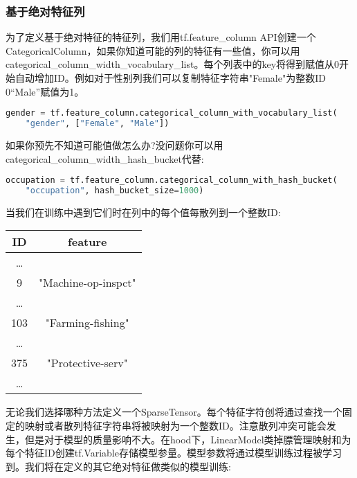 \subsubsection{基于绝对特征列}
为了定义基于绝对特征的特征列，我们用tf.feature\_column API创建一个CategoricalColumn，如果你知道可能的列的特征有一些值，你可以用categorical\_column\_width\_vocabulary\_list。每个列表中的key将得到赋值从0开始自动增加ID。例如对于性别列我们可以复制特征字符串"Female"为整数ID 0“Male”赋值为1。
\begin{lstlisting}[language=Python]
gender = tf.feature_column.categorical_column_with_vocabulary_list(
    "gender", ["Female", "Male"])
\end{lstlisting}
如果你预先不知道可能值做怎么办?没问题你可以用categorical\_column\_width\_hash\_bucket代替:
\begin{lstlisting}[language=Python]
occupation = tf.feature_column.categorical_column_with_hash_bucket(
    "occupation", hash_bucket_size=1000)
\end{lstlisting}
当我们在训练中遇到它们时在列中的每个值每散列到一个整数ID:
\begin{table}[H]
\centering
\begin{tabular}{|c|c|}
\hline
ID&feature\\
\hline
\ldots&\\
\hline
9&"Machine-op-inspct"\\
\hline
\ldots&\\
\hline
103&"Farming-fishing"\\
\hline
\ldots&\\
\hline
375&"Protective-serv"\\
\hline
\ldots&\\
\hline
\end{tabular}
\end{table}
无论我们选择哪种方法定义一个SparseTensor。每个特征字符创将通过查找一个固定的映射或者散列特征字符串将被映射为一个整数ID。注意散列冲突可能会发生，但是对于模型的质量影响不大。在hood下，LinearModel类掉膘管理映射和为每个特征ID创建tf.Variable存储模型参量。模型参数将通过模型训练过程被学习到。我们将在定义的其它绝对特征做类似的模型训练:
